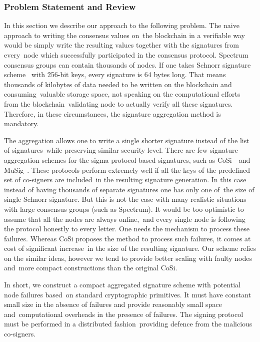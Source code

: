 \subsubsection{Problem Statement and Review}

In this section we describe our approach to the following problem.
The naive approach to writing the consensus values on\
the blockchain in a verifiable way would be simply write the resulting values together with the signatures from every\
node which successfully participated in the consensus protocol.
Spectrum consensus groups can contain thousands of nodes.
If one takes Schnorr signature scheme~\cite{Schnorr1991} with 256-bit keys, every signature is 64 bytes long.
That means thousands of kilobytes of data needed to be written on the blockchain and consuming\
valuable storage space, not speaking on the computational efforts from the blockchain\
validating node to actually verify all these signatures.
Therefore, in these circumstances, the signature aggregation method is mandatory.

The aggregation allows one to write a single shorter signature instead of the list of signatures\
while preserving similar security level.
There are few signature aggregation schemes for the sigma-protocol based signatures, such as CoSi~\cite{Syta2016}\
and MuSig~\cite{Itakura1983APC}.
These protocols perform extremely well if all the keys of the predefined set of co-signers are included\
in the resulting signature generation.
In this case instead of having thousands of separate signatures one has only one of\
the size of single Schnorr signature.
But this is not the case with many realistic situations with large consensus groups (such as Spectrum).
It would be too optimistic to assume that all the nodes are always online,\
and every single node is following the protocol honestly to every letter.
One needs the mechanism to process these failures.
Whereas CoSi proposes the method to process such failures, it comes at cost of significant increase\
in the size of the resulting signature.
Our scheme relies on the similar ideas, however we tend to provide better scaling with faulty nodes and\
more compact constructions than the original CoSi.

In short, we construct a compact aggregated signature scheme with potential node failures based\
on standard cryptographic primitives.
It must have constant small size in the absence of failures and provide reasonably small space and\
computational overheads in the presence of failures.
The signing protocol must be performed in a distributed fashion\
providing defence from the malicious co-signers.


